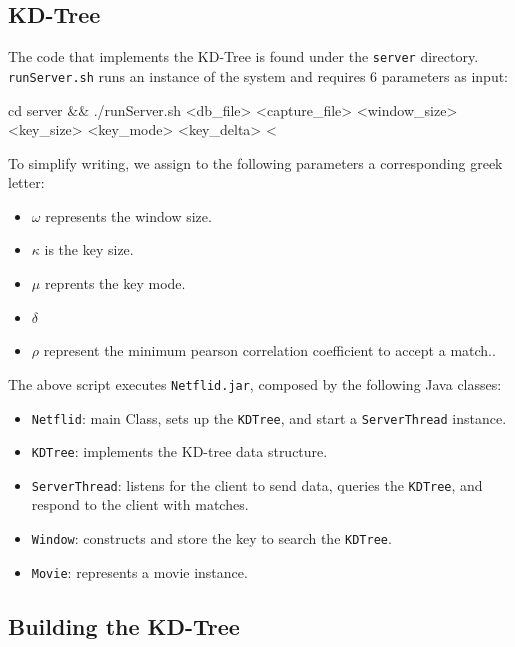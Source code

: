 \subsection{KD-Tree}

The code that implements the KD-Tree is found under the \texttt{server}
directory. \texttt{runServer.sh} runs an instance of the system and requires 6
parameters as input:

\begin{bash_script}[caption={Start the Java Server}, label={lst:java}]
        cd server && ./runServer.sh <db_file> <capture_file> <window_size> <key_size> <key_mode> <key_delta> <
\end{bash_script}

To simplify writing, we assign to the following parameters a corresponding greek letter:

\begin{itemize}
    \item $\omega$ represents the window size.
    \item $\kappa$ is the key size. 
    \item $\mu$ reprents the key mode.
    \item $\delta$ 
    \item $\rho$ represent the minimum pearson correlation coefficient to accept a match..
\end{itemize}

The above script executes \texttt{Netflid.jar}, composed by the following
Java classes:

\begin{itemize}
    \item \texttt{Netflid}: main Class, sets up the \texttt{KDTree}, and start a
        \texttt{ServerThread} instance.
    \item \texttt{KDTree}: implements the KD-tree data structure.
    \item \texttt{ServerThread}: listens for the client to send data, queries
        the \texttt{KDTree}, and respond to the client with matches.
    \item \texttt{Window}: constructs and store the key to search the \texttt{KDTree}.
    \item \texttt{Movie}: represents a movie instance.

\end{itemize}

\subsection{Building the KD-Tree}


